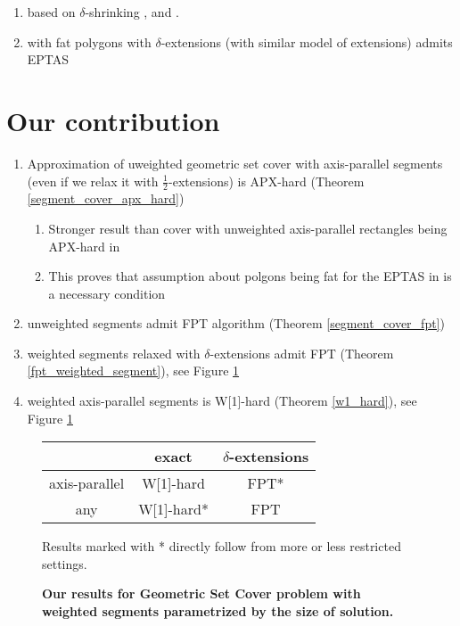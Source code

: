 \begin{enumerate}
\item based on $\delta$-shrinking \cite{shrinking_original}, \cite{shriking1} and \cite{shrinking2}.
\item with fat polygons with $\delta$-extensions (with similar model of extensions) admits EPTAS \cite{harpeled12}
\end{enumerate}

\section{Our contribution}
\begin{enumerate}
\item Approximation of uweighted geometric set cover with axis-parallel segments
(even if we relax it with  $\frac{1}{2}$-extensions) is APX-hard
(Theorem \ref{segment_cover_apx_hard})
	\begin{enumerate}
	\item Stronger result than cover with unweighted axis-parallel
	rectangles being APX-hard in \cite{rectangles_apx_hard}
	\item This proves that assumption about polgons being fat for
	the EPTAS in \cite{harpeled12} is a necessary condition
	\end{enumerate}
\item unweighted segments admit FPT algorithm (Theorem \ref{segment_cover_fpt})
\item weighted segments relaxed with $\delta$-extensions admit FPT (Theorem \ref{fpt_weighted_segment}),
    see Figure \ref{tab:weighted_fpt}
\item weighted axis-parallel segments is W[1]-hard (Theorem \ref{w1_hard}),
    see Figure \ref{tab:weighted_fpt}

\end{enumerate}


\begin{figure}[h]
\begin{center}
\begin{tabular}{ | c | c | c | }
\hline
                & exact     & $\delta$-extensions \\ 
\hline                
 axis-parallel   & W[1]-hard & FPT* \\  
\hline                
 any             & W[1]-hard* & FPT \\
\hline                
\end{tabular}
\caption{\textbf{Our results for Geometric Set Cover problem with weighted segments 
parametrized by the size of solution.}}

Results marked with * directly follow from more or less restricted settings.
\label{tab:weighted_fpt}
\end{center}
\end{figure}


